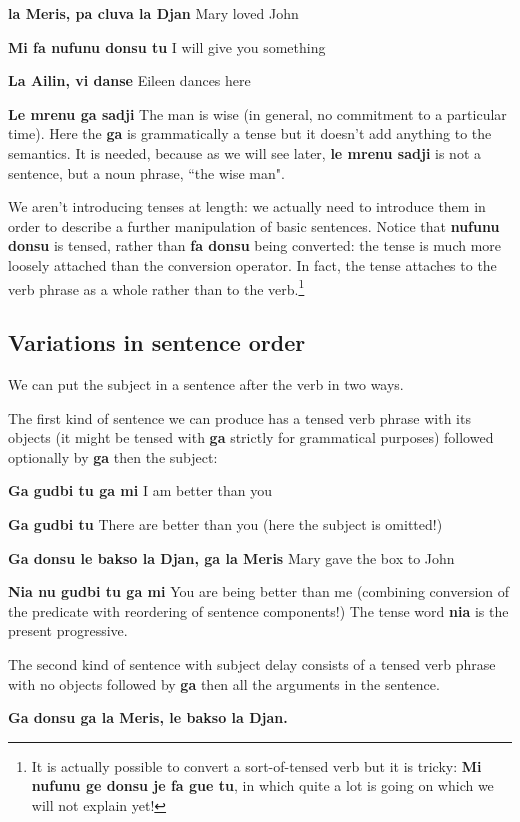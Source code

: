 \documentclass[12pt]{book}
\begin{document}
{{\bf la Meris, pa cluva la Djan} Mary loved John

{\bf Mi fa nufunu donsu tu}  I will give you something

{\bf La Ailin, vi danse}  Eileen dances here

{\bf Le mrenu ga sadji}  The man is wise (in general, no commitment to a particular time).  Here the {\bf ga} is grammatically a tense but it doesn't add anything to the semantics.  It is needed, because as we will see later, {\bf le mrenu sadji} is not a sentence, but a noun phrase, ``the wise man".

We aren't introducing tenses at length:  we actually need to introduce them in order to describe a further manipulation of basic sentences.  Notice that
{\bf nufunu donsu} is tensed, rather than {\bf fa donsu} being converted:  the tense is much more loosely attached than the conversion operator.  In fact, the tense
attaches to the verb phrase as a whole rather than to the verb.\footnote{It is actually possible to convert a sort-of-tensed verb but it is tricky:  {\bf Mi nufunu ge donsu je fa gue tu}, in which quite a lot is going on which we will not explain yet!}

\subsection{Variations in sentence order}

We can put the subject in a sentence after the verb in two ways.

  The first kind of sentence we can produce has a tensed verb phrase  with its objects (it might be tensed with {\bf ga} strictly for grammatical purposes) followed optionally by {\bf ga} then the subject:

{\bf Ga gudbi tu ga mi}  I am better than you

{\bf Ga gudbi tu}  There are better than you (here the subject is omitted!)

{\bf Ga donsu le bakso la Djan, ga la Meris}  Mary gave the box to John

{\bf Nia nu gudbi tu ga mi}  You are being better than me (combining conversion of the predicate with reordering of sentence components!)  The tense word {\bf nia} is the present progressive.

The second kind of sentence with subject delay consists of a tensed verb phrase with no objects followed by {\bf ga} then all the arguments in the sentence.

{\bf Ga donsu ga  la Meris, le bakso la Djan.}

}
\end{document}
